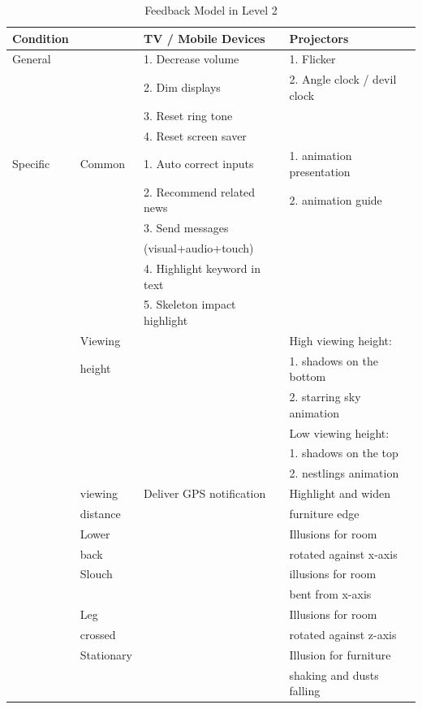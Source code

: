 \begin{table}
\centering
\begin{tabular}{l l l l} 
\hline\hline
 Condition && TV / Mobile Devices & Projectors\\
\hline\hline
General & &1. Decrease volume & 1. Flicker\\
 & &2. Dim displays &2. Angle clock / devil clock\\
& &3. Reset ring tone &\\
 & &4. Reset screen saver &\\
\hline
Specific & Common &1. Auto correct
inputs  & 1. animation presentation\\  
 & & 2. Recommend related news  & 2. animation guide\\
 & & 3. Send messages & \\
 & & (visual+audio+touch) &\\
 & & 4. Highlight keyword in text &\\
 & & 5. Skeleton impact highlight &\\
\hline
 & Viewing & & High viewing height:\\
 & height & & 1. shadows on the bottom\\
 & & & 2. starring sky animation\\
 & & & Low viewing height:\\
& & & 1. shadows on the top\\
 & & & 2. nestlings animation\\
\hline
&viewing & Deliver GPS notification &  Highlight and widen\\
& distance & & furniture edge\\
\hline
& Lower & & Illusions for room\\
 & back & & rotated against x-axis\\
\hline
& Slouch & & illusions for room\\
& & &  bent from x-axis\\
\hline
& Leg &&  Illusions for room\\
& crossed &&  rotated against z-axis\\
\hline
& Stationary & & Illusion for furniture\\
&&& shaking and dusts falling\\
\hline\hline
\end{tabular}
\caption{Feedback Model in Level 2}
\label{tab:feedback_model_lvl2}
\end{table}

